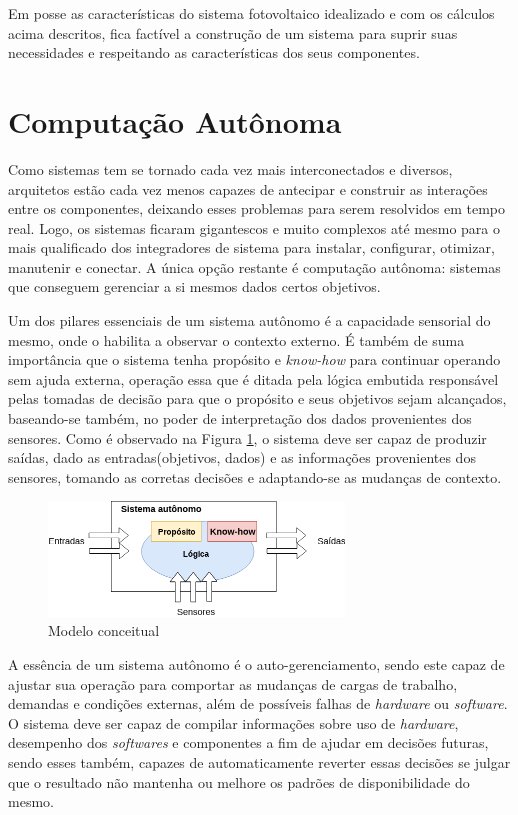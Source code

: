 Em posse as características do sistema fotovoltaico idealizado e com os cálculos acima descritos, fica factível a construção de um sistema para suprir suas necessidades e respeitando as características dos seus componentes.

\section{Computação Autônoma}

Como sistemas tem se tornado cada vez mais interconectados e diversos, arquitetos estão cada vez menos capazes de antecipar e construir as interações entre os componentes, deixando esses problemas para serem resolvidos em tempo real. Logo, os sistemas ficaram gigantescos e muito complexos até mesmo para o mais qualificado dos integradores de sistema para instalar, configurar, otimizar, manutenir e conectar. A única opção restante é computação autônoma: sistemas que conseguem gerenciar a si mesmos dados certos objetivos\cite{Kephart2003}.

Um dos pilares essenciais de um sistema autônomo é a capacidade sensorial do mesmo, onde o habilita a observar o contexto externo. É também de suma importância que o sistema tenha propósito e \textit{know-how} para continuar operando sem ajuda externa, operação essa que é ditada pela lógica embutida responsável pelas tomadas de decisão para que o propósito e seus objetivos sejam alcançados, baseando-se também, no poder de interpretação dos dados provenientes dos sensores. Como é observado na Figura \ref{fig:modelo-conceitual}, o sistema deve ser capaz de produzir saídas, dado as entradas(objetivos, dados) e as informações provenientes dos sensores, tomando as corretas decisões e adaptando-se as mudanças de contexto.

\begin{figure}[H]
    \centering
    \includegraphics[width=0.7\textwidth]{figuras/autonomo.png}
    \caption{Modelo conceitual}
    \label{fig:modelo-conceitual}
\end{figure}


A essência de um sistema autônomo é o auto-gerenciamento, sendo este capaz de ajustar sua operação para comportar as mudanças de cargas de trabalho, demandas e condições externas, além de possíveis falhas de \textit{hardware} ou \textit{software}. O sistema deve ser capaz de compilar informações sobre uso de \textit{hardware}, desempenho dos \textit{softwares} e componentes a fim de ajudar em decisões futuras, sendo esses também, capazes de automaticamente reverter essas decisões se julgar que o resultado não mantenha ou melhore os padrões de disponibilidade do mesmo.

